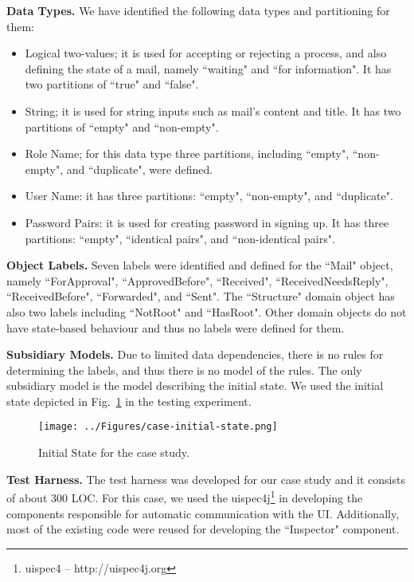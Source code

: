 \textbf{Data Types.}  We have identified the following data types and partitioning for them:
\begin{itemize}
	\item Logical two-values; it is used for accepting or rejecting a process, and also defining the state of a mail, namely ``waiting" and ``for information". It has two partitions of ``true" and ``false".
	
	\item String; it is used for string inputs such as mail's content and title. It has two partitions of ``empty" and ``non-empty". 
	
	\item Role Name; for this data type three partitions, including ``empty", ``non-empty", and ``duplicate",  were defined.
	
	\item User Name: it has three partitions: ``empty", ``non-empty", and ``duplicate".
	
	\item Password Pairs: it is used for creating password in signing up. It has three partitions: ``empty", ``identical pairs", and ``non-identical pairs".
\end{itemize}

 \textbf{Object Labels.} Seven labels were identified and defined for the ``Mail" object, namely ``ForApproval", ``ApprovedBefore", ``Received", ``ReceivedNeedsReply", ``ReceivedBefore", ``Forwarded", and ``Sent". The ``Structure" domain object has also two labels including ``NotRoot" and ``HasRoot". Other domain objects do not have state-based behaviour and thus no labels were defined for them.

\textbf{Subsidiary Models.} Due to limited data dependencies, there is no rules for determining the labels, and thus there is no model of the rules. The only subsidiary model is the model describing the initial state. We used the initial state depicted in Fig.~\ref{fig:case-initial-state} in the testing experiment.

\begin{figure}[h]
\centering
\texttt{[image: ../Figures/case-initial-state.png]}
\caption{Initial State for the case study.}
\label{fig:case-initial-state}
\end{figure}

\textbf{Test Harness.} The test harness was developed for our case study and it consists of about 300 LOC. For this case, we used the uispec4j\footnote{ uispec4 – http://uispec4j.org} in developing the components responsible for automatic communication with the UI. Additionally, most of the existing code were reused for developing the ``Inspector" component.
 
